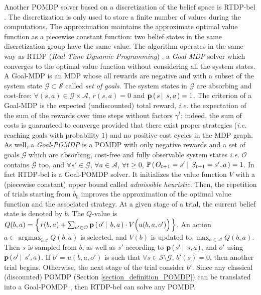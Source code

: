 Another POMDP solver based on a discretization of the belief space is RTDP-bel \cite{Geffner98solvinglarge}.
The discretization is only used to store a finite number of values during the computations.
The approximation maintains the approximate optimal value function as a piecewise constant function:
two belief states in the same discretization group have the same value.
The algorithm operates in the same way as RTDP (\textit{Real Time Dynamic Programming}) \cite{Barto93learningto},
a \textit{Goal-MDP} solver which converges to the optimal value function without considering all the system states.
A Goal-MDP \cite{Bertsekas:2000:DPO:517430} is an MDP 
whose all rewards are negative and with a subset of the system state $\mathcal{G} \subset \mathcal{S}$
called \textit{set of goals}. The system states in $\mathcal{G}$ are absorbing and cost-free: 
$\forall (s,a) \in \mathcal{G} \times \mathcal{A}$,
$r(s,a)=0$ and $\textbf{p} \left( \left. s \, \right| \left. \, s,a \right. \right) = 1$.
The criterion of a Goal-MDP is the expected (undiscounted) total reward,
\textit{i.e.} the expectation of the sum of the rewards over time steps 
without factors $\gamma^t$: indeed, the sum of costs is guaranteed
to converge provided that there exist proper strategies
(\textit{i.e.} reaching goals with probability $1$)
and no positive-cost cycles in the MDP graph.
As well, a \textit{Goal-POMDP} is a POMDP with only negative rewards
and a set of goals $\mathcal{G}$ which are  absorbing, cost-free and fully observable system states \textit{i.e.}
$\mathcal{O}$ contains $\mathcal{G}$ too, 
and $\forall s' \in \mathcal{G}$, $\forall a \in \mathcal{A}$, $\forall t \geqslant 0$,
$\mathbb{P} \left( \left.  O_{t+1} = s' \, \right| \left. \, S_{t+1} = s', a   \right. \right) = 1$.
In fact RTDP-bel is a Goal-POMDP solver.
It initializes the value function $V$ with a (piecewise constant) upper bound called \textit{admissible heuristic}.
Then, the repetition of trials starting from $b_0$ improves the approximation of the optimal value function and the associated strategy.
At a given stage of a trial, the current belief state is denoted by $b$. 
The $Q$-value is $Q(b,a) = \left\{ \left.  r(b,a) + \sum_{o' \in \mathcal{O}} \textbf{p} \left( \left.  o' \, \right| \left. \, b, a   \right. \right) \cdot V \Big( u(b,a,o') \Big)  \right. \right\}$.
An action $a \in \operatorname*{argmax}_{\tilde{a} \mathcal{A}} Q(b,\tilde{a})$
is selected, and $V(b)$ is updated to $\max_{a \in \mathcal{A}} Q(b,a)$.
Then $s$ is sampled from $b$, as well as $s'$ according to $\textbf{p} \left( \left.  s' \, \right| \left. \, s,a  \right. \right)$, 
and $o'$ using $\textbf{p} \left( \left.  o' \, \right| \left. \, s',a  \right. \right)$.
If $b'=u(b,a,o')$ is such that $\forall s \in \mathcal{S}\setminus\mathcal{G}$, 
$b'(s)=0$, then another trial begins. Otherwise, the next stage of the trial consider $b'$.
Since any classical (discounted) POMDP (Section \ref{section_definition_POMDP})
can be translated into a Goal-POMDP \cite{DBLP:conf/ijcai/BonetG09},
then RTDP-bel can solve any POMDP.

